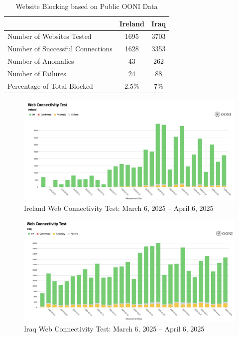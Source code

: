 \begin{table}[H]
\centering
\caption{Website Blocking based on Public OONI Data}
\begin{tabular}{lcc}
\toprule
\textbf{} & \textbf{Ireland} & \textbf{Iraq} \\
\midrule
Number of Websites Tested           & 1695 & 3703 \\
Number of Successful Connections    & 1628 & 3353 \\
Number of Anomalies                 & 43 & 262 \\
Number of Failures                  & 24 & 88 \\
\bottomrule
Percentage of Total Blocked         & 2.5\% & 7\% \\
\end{tabular}
\label{tab:category_block}
\end{table}

\begin{figure}[H]
    \centering
    \includegraphics[width=\textwidth]{Griff/TCD SCSS CAPSTONE/Results/IrelandWebsiteTest.png}
    \caption{Ireland Web Connectivity Test: March 6, 2025 -- April 6, 2025}
    \label{fig:iraq-middlebox-HTTP-manipulation}
\end{figure}

\begin{figure}[H]
    \centering
    \includegraphics[width=\textwidth]{Griff/TCD SCSS CAPSTONE/Results/IraqWebsiteTest.png}
    \caption{Iraq Web Connectivity Test: March 6, 2025 -- April 6, 2025}
    \label{fig:iraq-middlebox-HTTP-manipulation}
\end{figure}

